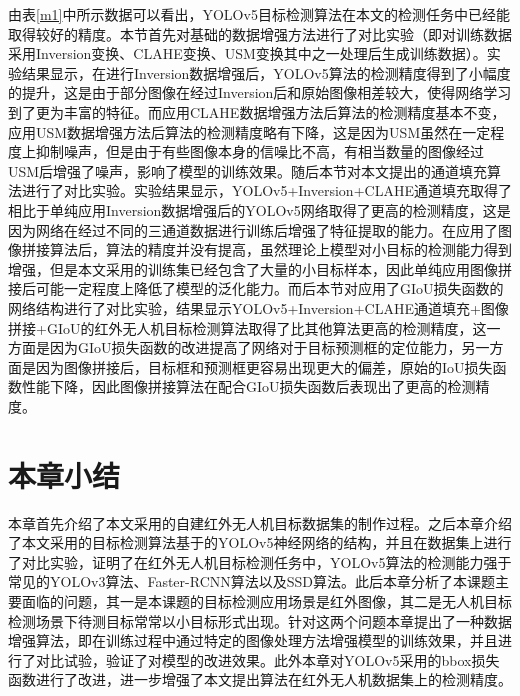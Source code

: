 由表\ref{m1}中所示数据可以看出，YOLOv5目标检测算法在本文的检测任务中已经能取得较好的精度。本节首先对基础的数据增强方法进行了对比实验（即对训练数据采用Inversion变换、CLAHE变换、USM变换其中之一处理后生成训练数据）。实验结果显示，在进行Inversion数据增强后，YOLOv5算法的检测精度得到了小幅度的提升，这是由于部分图像在经过Inversion后和原始图像相差较大，使得网络学习到了更为丰富的特征。而应用CLAHE数据增强方法后算法的检测精度基本不变，应用USM数据增强方法后算法的检测精度略有下降，这是因为USM虽然在一定程度上抑制噪声，但是由于有些图像本身的信噪比不高，有相当数量的图像经过USM后增强了噪声，影响了模型的训练效果。随后本节对本文提出的通道填充算法进行了对比实验。实验结果显示，YOLOv5+Inversion+CLAHE通道填充取得了相比于单纯应用Inversion数据增强后的YOLOv5网络取得了更高的检测精度，这是因为网络在经过不同的三通道数据进行训练后增强了特征提取的能力。在应用了图像拼接算法后，算法的精度并没有提高，虽然理论上模型对小目标的检测能力得到增强，但是本文采用的训练集已经包含了大量的小目标样本，因此单纯应用图像拼接后可能一定程度上降低了模型的泛化能力。而后本节对应用了GIoU损失函数的网络结构进行了对比实验，结果显示YOLOv5+Inversion+CLAHE通道填充+图像拼接+GIoU的红外无人机目标检测算法取得了比其他算法更高的检测精度，这一方面是因为GIoU损失函数的改进提高了网络对于目标预测框的定位能力，另一方面是因为图像拼接后，目标框和预测框更容易出现更大的偏差，原始的IoU损失函数性能下降，因此图像拼接算法在配合GIoU损失函数后表现出了更高的检测精度。

\section{本章小结}
本章首先介绍了本文采用的自建红外无人机目标数据集的制作过程。之后本章介绍了本文采用的目标检测算法基于的YOLOv5神经网络的结构，并且在数据集上进行了对比实验，证明了在红外无人机目标检测任务中，YOLOv5算法的检测能力强于常见的YOLOv3算法、Faster-RCNN算法以及SSD算法。此后本章分析了本课题主要面临的问题，其一是本课题的目标检测应用场景是红外图像，其二是无人机目标检测场景下待测目标常常以小目标形式出现。针对这两个问题本章提出了一种数据增强算法，即在训练过程中通过特定的图像处理方法增强模型的训练效果，并且进行了对比试验，验证了对模型的改进效果。此外本章对YOLOv5采用的bbox损失函数进行了改进，进一步增强了本文提出算法在红外无人机数据集上的检测精度。









